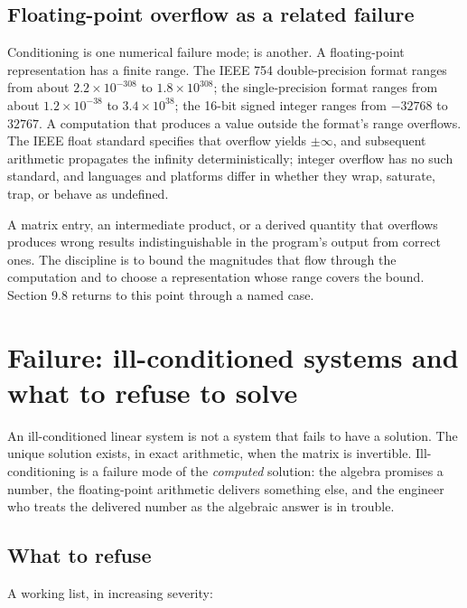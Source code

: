 \subsection{Floating-point overflow as a related failure}

Conditioning is one numerical failure mode;  is
another. A floating-point representation has a finite range. The
IEEE 754 double-precision format ranges from about $2.2 \times
10^{-308}$ to $1.8 \times 10^{308}$; the single-precision format
ranges from about $1.2 \times 10^{-38}$ to $3.4 \times 10^{38}$;
the 16-bit signed integer ranges from $-32768$ to $32767$. A
computation that produces a value outside the format's range
overflows. The IEEE float standard specifies that overflow yields
$\pm\infty$, and subsequent arithmetic propagates the infinity
deterministically; integer overflow has no such standard, and
languages and platforms differ in whether they wrap, saturate,
trap, or behave as undefined.

A matrix entry, an intermediate product, or a derived quantity that
overflows produces wrong results indistinguishable in the program's
output from correct ones. The discipline is to bound the magnitudes
that flow through the computation and to choose a representation
whose range covers the bound. Section 9.8 returns to this point
through a named case.

\section{Failure: ill-conditioned systems and what to refuse to solve}

An ill-conditioned linear system is not a system that fails to have
a solution. The unique solution exists, in exact arithmetic, when
the matrix is invertible. Ill-conditioning is a failure mode of the
\emph{computed} solution: the algebra promises a number, the
floating-point arithmetic delivers something else, and the engineer
who treats the delivered number as the algebraic answer is in
trouble.

\subsection{What to refuse}

A working list, in increasing severity:

